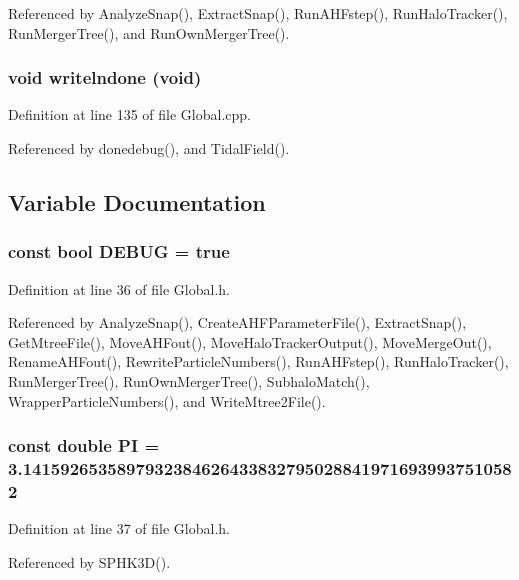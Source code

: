 Referenced by AnalyzeSnap(), ExtractSnap(), RunAHFstep(), RunHaloTracker(), RunMergerTree(), and RunOwnMergerTree().

\subsubsection[{writelndone}]{\setlength{\rightskip}{0pt plus 5cm}void writelndone (void)}\label{Global_8h_a6ea51689681a48365e4852a63687b8e6}


Definition at line 135 of file Global.cpp.



Referenced by donedebug(), and TidalField().



\subsection{Variable Documentation}
\subsubsection[{DEBUG}]{\setlength{\rightskip}{0pt plus 5cm}const bool {\bf DEBUG} = true}\label{Global_8h_a9c4ab189c2f018bc7ccc8ba4f6e04b9d}


Definition at line 36 of file Global.h.



Referenced by AnalyzeSnap(), CreateAHFParameterFile(), ExtractSnap(), GetMtreeFile(), MoveAHFout(), MoveHaloTrackerOutput(), MoveMergeOut(), RenameAHFout(), RewriteParticleNumbers(), RunAHFstep(), RunHaloTracker(), RunMergerTree(), RunOwnMergerTree(), SubhaloMatch(), WrapperParticleNumbers(), and WriteMtree2File().

\subsubsection[{PI}]{\setlength{\rightskip}{0pt plus 5cm}const double {\bf PI} = 3.14159265358979323846264338327950288419716939937510582}\label{Global_8h_a952eac791b596a61bba0a133a3bb439f}


Definition at line 37 of file Global.h.



Referenced by SPHK3D().

